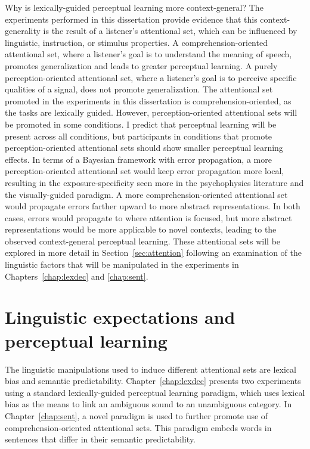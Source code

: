 Why is lexically-guided perceptual learning more context-general?
The experiments performed in this dissertation provide evidence that this context-generality is the result of a listener's attentional set, which can be influenced by linguistic, instruction, or stimulus properties.
A comprehension-oriented attentional set, where a listener's goal is to understand the meaning of speech, promotes generalization and leads to greater perceptual learning.  
A purely perception-oriented attentional set, where a listener's goal is to perceive specific qualities of a signal, does not promote generalization.
The attentional set promoted in the experiments in this dissertation is comprehension-oriented, as the tasks are lexically guided.
However, perception-oriented attentional sets will be promoted in some conditions.
I predict that perceptual learning will be present across all conditions, but participants in conditions that promote perception-oriented attentional sets should show smaller perceptual learning effects.
In terms of a Bayesian framework with error propagation, a more perception-oriented attentional set would keep error propagation more local, resulting in the exposure-specificity seen more in the psychophysics literature and the visually-guided paradigm.
A more comprehension-oriented attentional set would propagate errors farther upward to more abstract representations.
In both cases, errors would propagate to where attention is focused, but more abstract representations would be more applicable to novel contexts, leading to the observed context-general perceptual learning.
These attentional sets will be explored in more detail in Section~\ref{sec:attention} following an examination of the linguistic factors that will be manipulated in the experiments in Chapters~\ref{chap:lexdec} and \ref{chap:sent}.

\section{Linguistic expectations and perceptual learning}
\label{sec:linguistic}

The linguistic manipulations used to induce different attentional sets are lexical bias and semantic predictability.
Chapter~\ref{chap:lexdec} presents two experiments using a standard lexically-guided perceptual learning paradigm, which uses lexical bias as the means to link an ambiguous sound to an unambiguous category.
In Chapter~\ref{chap:sent}, a novel paradigm is used to further promote use of comprehension-oriented attentional sets.  This paradigm embeds words in sentences that differ in their semantic predictability.

